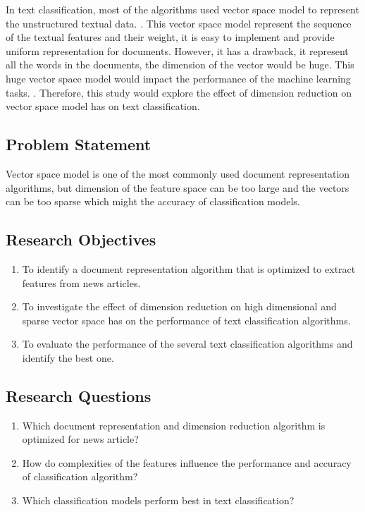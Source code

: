 In text classification, most of the algorithms used vector space model to represent the unstructured textual data. \cite{vectorSpaceModelText}. This vector space model represent the sequence of the textual features and their weight, it is easy to implement and provide uniform representation for documents. However, it has a drawback, it represent all the words in the documents, the dimension of the vector would be huge. This huge vector space model would impact the performance of the machine learning tasks. \cite{knnVectorSpaceReduction}. Therefore, this study would explore the effect of dimension reduction on vector space model has on text classification.\\

\subsection{Problem Statement}
Vector space model is one of the most commonly used document representation algorithms, but dimension of the feature space can be too large and the vectors can be too sparse which might the accuracy of classification models.\\

\clearpage
\subsection{Research Objectives}
\begin{enumerate}
	\item To identify a document representation algorithm that is optimized to extract features from news articles.
	\item To investigate the effect of dimension reduction on high dimensional and sparse vector space has on the performance of text classification algorithms.
	\item To evaluate the performance of the several text classification algorithms and identify the best one.
\end{enumerate}


\subsection{Research Questions}
\begin{enumerate}
	\item Which document representation and dimension reduction algorithm is optimized for news article?
	\item How do complexities of the features influence the performance and accuracy of classification algorithm?
	\item Which classification models perform best in text classification?
\end{enumerate}

